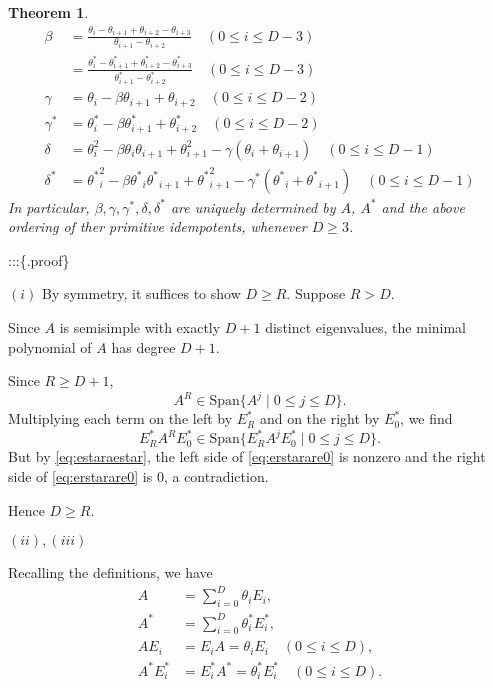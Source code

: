 \documentclass[
]{book}
\newtheorem{theorem}{Theorem}[chapter]
\theoremstyle{definition}
\theoremstyle{definition}
\theoremstyle{definition}
\theoremstyle{definition}
\theoremstyle{remark}
\begin{document}
\begin{theorem}
\begin{align}
\beta & = \frac{\theta_i-\theta_{i+1}+\theta_{i+2}-\theta_{i+3}}{\theta_{i+1}-\theta_{i+2}} \quad (0\leq i\leq D-3) \label{eq:beta}\\
& = \frac{\theta^*_i-\theta^*_{i+1}+\theta^*_{i+2}-\theta^*_{i+3}}{\theta^*_{i+1}-\theta^*_{i+2}} \quad (0\leq i\leq D-3) \label{eq:betastar}\\
\gamma & = \theta_i - \beta \theta_{i+1} + \theta_{i+2} \quad (0\leq i\leq D-2) \label{eq:gamma1}\\
\gamma^* & = \theta^*_i - \beta \theta^*_{i+1} + \theta^*_{i+2} \quad (0\leq i\leq D-2) \label{eq:gammastar}\\
\delta & = \theta^2_i - \beta \theta_i\theta_{i+1} + \theta^2_{i+1} - \gamma(\theta_i + \theta_{i+1}) \quad (0\leq i\leq D-1) \label{eq:delta}\\
\delta^* & = {\theta^*}^2_i - \beta {\theta^*}_i{\theta^*}_{i+1} + {\theta^*}^2_{i+1} - \gamma^*({\theta^*}_i + {\theta^*}_{i+1}) \quad (0\leq i\leq D-1) \label{eq:deltastar}
\end{align}
In particular, \(\beta, \gamma, \gamma^*, \delta, \delta^*\) are uniquely determined by \(A\), \(A^*\) and the above ordering of ther primitive idempotents, whenever \(D\geq 3\).
\end{theorem}

:::\{.proof\}

\((i)\) By symmetry, it suffices to show \(D\geq R\). Suppose \(R > D\).

Since \(A\) is semisimple with exactly \(D+1\) distinct eigenvalues, the minimal polynomial of \(A\) has degree \(D+1\).

Since \(R \geq D+1\),
\[A^R \in \mathrm{Span}\{A^j\mid 0\leq j\leq D\}.\]
Multiplying each term on the left by \(E^*_R\) and on the right by \(E^*_0\), we find
\begin{equation}
E^*_RA^RE_0^* \in \mathrm{Span}\{E^*_RA^jE^*_0\mid 0\leq j\leq D\}. \label{eq:erstarare0}
\end{equation}
But by \eqref{eq:estaraestar}, the left side of \eqref{eq:erstarare0} is nonzero and the right side of \eqref{eq:erstarare0} is \(0\), a contradiction.

Hence \(D\geq R\).

\((ii), (iii)\)

Recalling the definitions, we have
\begin{align}
A & = \sum_{i=0}^D \theta_i E_i,\\
A^* & = \sum_{i=0}^D \theta_i^* E_i^*,\\
AE_i & = E_iA = \theta_iE_i \quad (0\leq i\leq D),\\
A^*E_i^* & = E_i^*A^* = \theta_i^*E_i^* \quad (0\leq i\leq D).
\end{align}
\end{document}
